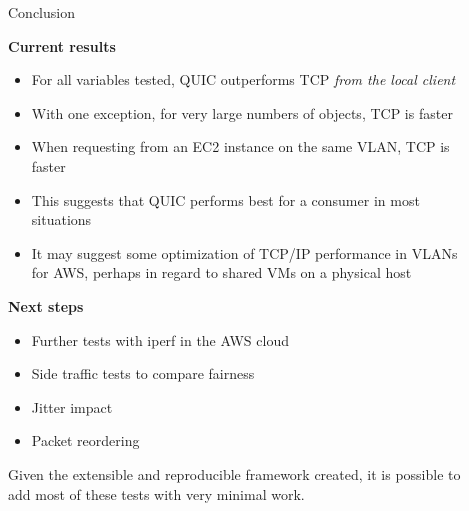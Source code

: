 \documentclass[final]{beamer}
\newlength{\sepwid}
\newlength{\onecolwid}
\begin{document}
\begin{frame}[t]
\begin{columns}[t]
\begin{column}{\onecolwid}
\end{column} %

\begin{column}{\sepwid}\end{column} %

\begin{column}{\onecolwid} %




\begin{block}{Conclusion}

\textbf{Current results}

\begin{itemize}
\item For all variables tested, QUIC outperforms TCP \textit{from the local client}
\item With one exception, for very large numbers of objects, TCP is faster
\item When requesting from an EC2 instance on the same VLAN, TCP is faster
\item This suggests that QUIC performs best for a consumer in most situations
\item It may suggest some optimization of TCP/IP performance in VLANs for AWS, perhaps in regard to shared VMs on a physical host
\end{itemize}

\textbf{Next steps}
\begin{itemize}
	\item Further tests with iperf in the AWS cloud
	\item Side traffic tests to compare fairness
	\item Jitter impact
	\item Packet reordering
\end{itemize}

Given the extensible and reproducible framework created, it is possible to add most of these tests with very minimal work.

\end{block}



\end{column}
\end{columns}
\end{frame}
\end{document}
